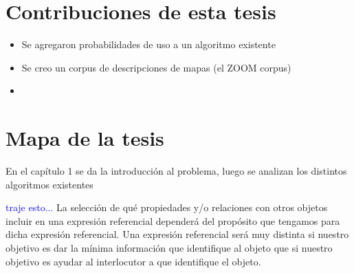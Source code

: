 

\section{Contribuciones de esta tesis}
\label{sec:contribiciones}

\begin{itemize}
\item Se agregaron probabilidades de uso a un algoritmo existente
\item Se creo un corpus de descripciones de mapas (el ZOOM corpus)
\item
\end{itemize}
\section{Mapa de la tesis}
\label{sec:mapadetesis}

En el cap\'itulo 1 se da la introducci\'on al problema, luego se analizan los distintos algoritmos existentes

\textcolor{blue}{traje esto...}
La selecci\'on de qu\'e propiedades y/o relaciones con otros objetos incluir en una expresi\'on referencial depender\'a del prop\'osito que tengamos para dicha expresi\'on referencial. Una expresi\'on referencial ser\'a muy distinta si nuestro objetivo es dar la m\'inima informaci\'on que identifique al objeto que si nuestro objetivo es ayudar al interlocutor a que identifique el objeto.\\

